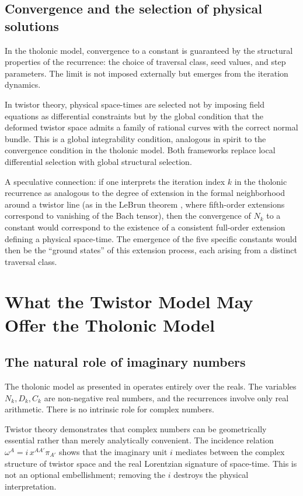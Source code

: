 \documentclass[12pt]{article}
\begin{document}
\subsection{Convergence and the selection of physical solutions}\label{sec:convergence}

In the tholonic model, convergence to a constant is guaranteed by the structural
properties of the recurrence: the choice of traversal class, seed values, and step
parameters.  The limit is not imposed externally but emerges from the iteration
dynamics.

In twistor theory, physical space-times are selected not by imposing field equations as
differential constraints but by the global condition that the deformed twistor space
admits a family of rational curves with the correct normal bundle.  This is a global
integrability condition, analogous in spirit to the convergence condition in the tholonic
model.  Both frameworks replace local differential selection with global structural
selection.

A speculative connection: if one interprets the iteration index $k$ in the tholonic
recurrence as analogous to the degree of extension in the formal neighborhood around a
twistor line (as in the LeBrun theorem \cite[Theorem~7.1]{ADM17}, where fifth-order
extensions correspond to vanishing of the Bach tensor), then the convergence of $N_k$ to
a constant would correspond to the existence of a consistent full-order extension
defining a physical space-time.  The emergence of the five specific constants would then
be the ``ground states'' of this extension process, each arising from a distinct
traversal class.

\section{What the Twistor Model May Offer the Tholonic Model}\label{sec:twistor-offers}

\subsection{The natural role of imaginary numbers}\label{sec:imaginary}

The tholonic model as presented in \cite{Mil24} operates entirely over the reals.
The variables $N_k, D_k, C_k$ are non-negative real numbers, and the recurrences involve
only real arithmetic.  There is no intrinsic role for complex numbers.

Twistor theory demonstrates that complex numbers can be geometrically essential rather
than merely analytically convenient.  The incidence relation $\omega^A = i\,x^{AA'}\pi_{A'}$
shows that the imaginary unit $i$ mediates between the complex structure of twistor space
and the real Lorentzian signature of space-time.  This is not an optional embellishment;
removing the $i$ destroys the physical interpretation.
\end{document}
